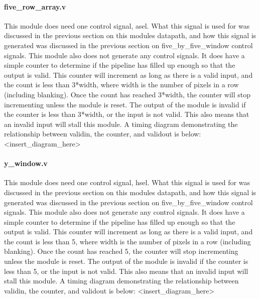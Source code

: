 \documentclass[12pt]{article}
\begin{document}
\paragraph{five\_row\_array.v}
This module does need one control signal, asel. What this signal is used for was 
discussed in the previous section on this modules datapath, and how this 
signal is generated was discussed in the previous section on five\_by\_five\_window 
control signals. This module also does not generate any control signals. It does 
have a simple counter to determine if the pipeline has filled up enough so that 
the output is valid. This counter will increment as long as there is a valid 
input, and the count is less than 3*width, where width is the number of pixels 
in a row (including blanking). Once the count has reached 3*width, the counter 
will stop incrementing unless the module is reset. The output of the module is 
invalid if the counter is less than 3*width, or the input is not valid. This 
also means that an invalid input will stall this module. A timing diagram 
demonstrating the relationship between validin, the counter, and validout is 
below: <insert\_diagram\_here>

\paragraph{y\_window.v}
This module does need one control signal, hsel. What this signal is used for was 
discussed in the previous section on this modules datapath, and how this 
signal is generated was discussed in the previous section on five\_by\_five\_window 
control signals. This module also does not generate any control signals. It does 
have a simple counter to determine if the pipeline has filled up enough so that 
the output is valid. This counter will increment as long as there is a valid 
input, and the count is less than 5, where width is the number of pixels in 
a row (including blanking). Once the count has reached 5, the counter will stop 
incrementing unless the module is reset. The output of the module is invalid if 
the counter is less than 5, or the input is not valid. This also means that an 
invalid input will stall this module. A timing diagram demonstrating the 
relationship between validin, the counter, and validout is below: 
<insert\_diagram\_here>
\end{document}
